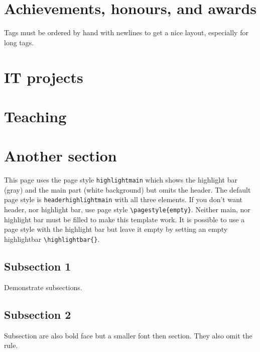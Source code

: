 \documentclass[singlesided,
               paper=a4,
               fontsize=10pt
              ]{my-resume}
\begin{document}
\section[\faTrophy]{Achievements, honours, and awards}

\medskip
Tags must be ordered by hand with newlines to get a nice layout, especially for long tags.

\section[\\faGears]{IT projects}

\section[\faBook]{Teaching}

\clearpage


\pagestyle{empty}

    \section{Another section}
    
    This page uses the page style \texttt{highlightmain} which shows the highlight bar (gray) and the main part (white background) but omits the header. 
    The default page style is \texttt{headerhighlightmain} with all three elements.
    If you don't want header, nor highlight bar, use page style \texttt{\textbackslash pagestyle\{empty\}}.
    \medskip
    Neither main, nor highlight bar must be filled to make this template work.
    It is possible to use a page style with the highlight bar but leave it empty by setting an empty highlightbar \texttt{\textbackslash highlightbar\{\}}.

    \vspace{0.5em}
    \subsection{Subsection 1}
    Demonstrate subsections.
    
    \subsection{Subsection 2}
    Subsection are also bold face but a smaller font then section. They also omit the rule.
    
\end{document}
